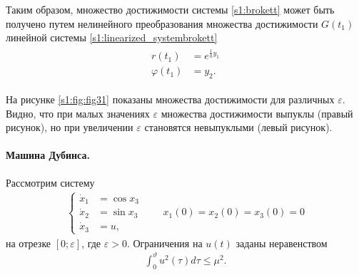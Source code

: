 \documentclass[../main.tex]{subfiles}
\begin{document}
Таким образом, множество достижимости системы \eqref{s1:brokett} может быть получено путем нелинейного преобразования множества достижимости $ G(t_1) $ линейной системы \eqref{s1:linearized_systembrokett}
\begin{gather*}
	\begin{aligned}
		r(t_1) &= e^{ \frac{1}{a} y_1}\\
		\varphi (t_1) &= y_2. 
	\end{aligned}
\end{gather*}

На рисунке \ref{s1:fig:fig31} показаны множества достижимости для различных $ \varepsilon $.
Видно, что при малых значениях $\varepsilon$ множества достижимости выпуклы (правый рисунок), но при увеличении $\varepsilon $ становятся невыпуклыми (левый рисунок).
\paragraph{Машина Дубинса.} 
Рассмотрим систему 
\begin{gather}\label{s1:system6}
 \left\{ \begin{aligned}
 \dot{x}_1 &= \cos x_3\\
 \dot{x}_2 &= \sin x_3\\
 \dot{x}_3 &= u,
\end{aligned} \right. \qquad x_1(0) = x_2(0) = x_3(0) = 0
\end{gather}
на отрезке $ \left[0;\varepsilon \right] $, где $ \varepsilon > 0 $.
Ограничения на $ u\left(t \right) $ заданы неравенством 
\begin{gather*}%
 \int_{0}^{\vartheta} u^2(\tau) d\tau \leqslant \mu^2.
\end{gather*}
 
\end{document}
